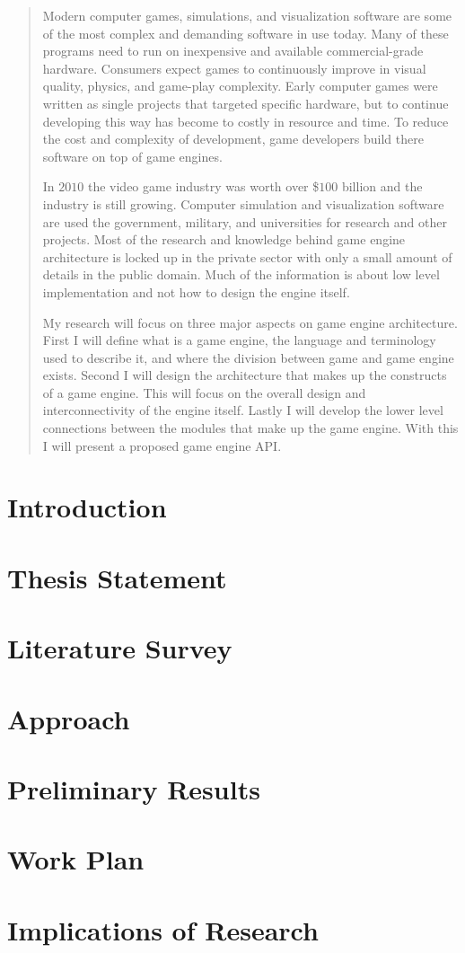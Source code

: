 \documentclass[12pt,a4paper,oneside]{article}
\begin{document}
\begin{abstract}
Modern computer games, simulations, and visualization software are some of the most complex and demanding software in use today.  Many of these programs need to run on inexpensive and available commercial-grade hardware.  Consumers expect games to continuously improve in visual quality, physics, and game-play complexity.  Early computer games were written as single projects that targeted specific hardware, but to continue developing this way has become to costly in resource and time.  To reduce the cost and complexity of development, game developers build there software on top of game engines.

In $2010$ the video game industry was worth over \$$100$ billion\citep{French:2010} and the industry is still growing.  Computer simulation and visualization software are used the government, military, and universities for research and other projects.  Most of the research and knowledge behind game engine architecture is locked up in the private sector with only a small amount of details in the public domain.  Much of the information is about low level implementation and not how to design the engine itself.

My research will focus on three major aspects on game engine architecture.  First I will define what is a game engine, the language and terminology used to describe it, and where the division between game and game engine exists.  Second I will design the architecture that makes up the constructs of a game engine.  This will focus on the overall design and interconnectivity of the engine itself.  Lastly I will develop the lower level connections between the modules that make up the game engine.  With this I will present a proposed game engine API.

\end{abstract}
\newpage 
\tableofcontents
\newpage 

\section{ Introduction }

\section{ Thesis Statement }

\section{ Literature Survey }

\section{ Approach }

\section{ Preliminary Results }

\section{ Work Plan }

\section{ Implications of Research }

\newpage
{}

\end{document}
